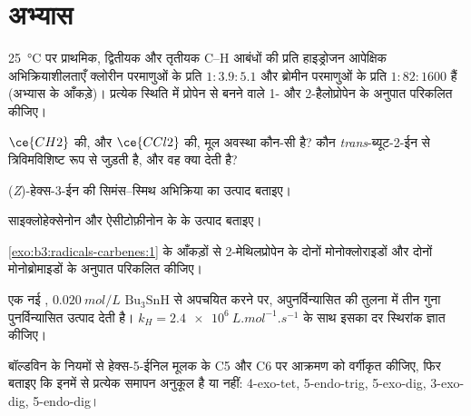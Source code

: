\section{अभ्यास}

\begin{exercise}[$\star$]\label{exo:b3:radicals-carbenes:1}
\qty{25}{\celsius} पर प्राथमिक, द्वितीयक और
तृतीयक C--H आबंधों की प्रति हाइड्रोजन आपेक्षिक अभिक्रियाशीलताएँ क्लोरीन परमाणुओं के प्रति $1 : 3.9 : 5.1$ और
ब्रोमीन परमाणुओं के प्रति $1 : 82 : 1600$ हैं (अभ्यास के आँकड़े)। प्रत्येक स्थिति में प्रोपेन से बनने वाले 1- और 2-हैलोप्रोपेन
के अनुपात परिकलित कीजिए।
\end{exercise}

\begin{exercise}[$\star$]\label{exo:b3:radicals-carbenes:2}
$\ce{CH2}$ की, और $\ce{CCl2}$ की, मूल अवस्था कौन-सी है? कौन
\textit{trans}-ब्यूट-2-ईन से त्रिविमविशिष्ट रूप से जुड़ती है, और वह क्या देती है?
\end{exercise}

\begin{exercise}[$\star$]\label{exo:b3:radicals-carbenes:3}
(\textit{Z})-हेक्स-3-ईन की सिमंस--स्मिथ अभिक्रिया का उत्पाद बताइए।
\end{exercise}

\begin{exercise}[$\star$]\label{exo:b3:radicals-carbenes:4}
साइक्लोहेक्सेनोन और ऐसीटोफ़ीनोन के  के उत्पाद बताइए।
\end{exercise}

\begin{exercise}[$\star\star$]\label{exo:b3:radicals-carbenes:5}
\cref{exo:b3:radicals-carbenes:1} के आँकड़ों से 2-मेथिलप्रोपेन के
दोनों मोनोक्लोराइडों और दोनों मोनोब्रोमाइडों के अनुपात परिकलित कीजिए।
\end{exercise}

\begin{exercise}[$\star\star$]\label{exo:b3:radicals-carbenes:6}
एक नई , $\qty{0.020}{mol/L}$ $\mathrm{Bu_3SnH}$ से अपचयित करने पर, अपुनर्विन्यासित की तुलना में तीन गुना
पुनर्विन्यासित उत्पाद देती है। $k_H = \qty{2.4e6}{L.mol^{-1}.s^{-1}}$ के साथ इसका दर स्थिरांक ज्ञात कीजिए।
\end{exercise}

\begin{exercise}[$\star\star$]\label{exo:b3:radicals-carbenes:7}
बॉल्डविन के नियमों से हेक्स-5-ईनिल मूलक के C5 और C6 पर आक्रमण को वर्गीकृत कीजिए,
फिर बताइए कि इनमें से प्रत्येक समापन अनुकूल है या नहीं: 4-exo-tet, 5-endo-trig,
5-exo-dig, 3-exo-dig, 5-endo-dig।
\end{exercise}

